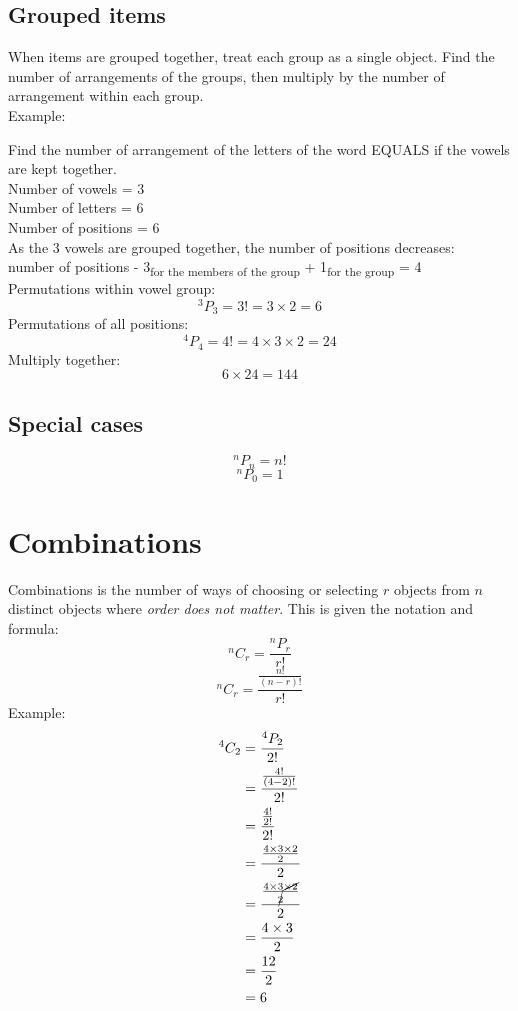 \documentclass[a4paper,10pt]{report}
\begin{document}
\subsection{Grouped items}
When items are grouped together, treat each group as a single object.  Find the number of arrangements of the groups, then multiply by the number of arrangement within each group.\\
Example:\\
\begin{center}
	Find the number of arrangement of the letters of the word EQUALS if the vowels are kept together.\\
	Number of vowels = 3\\
	Number of letters = 6\\
	Number of positions = 6\\
	As the 3 vowels are grouped together, the number of positions decreases:\\ number of positions - 3\textsubscript{for the members of the group} + 1\textsubscript{for the group} = 4\\
	Permutations within vowel group:
	$$^3P_3 = 3! = 3 \times 2 = 6$$
	Permutations of all positions:
	$$^4P_4 = 4! = 4 \times 3 \times 2 = 24$$
	Multiply together:
	$$6 \times 24 = 144$$
\end{center}

\subsection{Special cases}
$$^nP_n = n!$$
$$^nP_0 = 1$$


\section{Combinations}
Combinations is the number of ways of choosing or selecting $r$ objects from $n$ distinct objects where \emph{order does not matter}.  This is given the notation and formula:
$$^nC_r = \frac{^nP_r}{r!}$$
$$^nC_r = \frac{\frac{n!}{(n-r)!}}{r!}$$
Example:\\
\begin{align*}
	^4C_2 & = \frac{^4P_2}{2!}                                          \\
	      & = \frac{\frac{4!}{(4 - 2)!}}{2!}                            \\
	      & = \frac{\frac{4!}{2!}}{2!}                                  \\
	      & = \frac{\frac{4 \times 3 \times 2}{2}}{2}                   \\
	      & = \frac{\frac{4 \times 3 \cancel{\times 2}}{\cancel{2}}}{2} \\
	      & = \frac{4 \times 3}{2}                                      \\
	      & = \frac{12}{2}                                              \\
	      & = 6                                                         \\
\end{align*}
\end{document}
